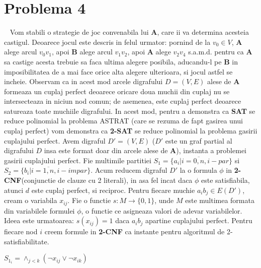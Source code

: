 \documentclass{article}
\begin{document}
\section{Problema 4}
\   
\newline
Vom stabili o strategie de joc convenabila lui \textbf{A}, care ii va determina acesteia  castigul. Deoarece jocul este descris in felul urmator: pornind de la $v_0 \in V$, \textbf{A} alege arcul $v_0v_1$, apoi \textbf{B} alege arcul $v_1v_2$, apoi \textbf{A} alege $v_2v_4$ s.a.m.d. pentru ca \textbf{A} sa castige acesta trebuie sa faca ultima alegere posibila, aducandu-l pe \textbf{B} in imposibilitatea de a mai face orice alta alegere ulterioara, si jocul astfel se incheie. 
\newline
\newline
Observam ca in acest mod arcele digrafului $D=(V,E)$ alese de \textbf{A} formeaza un cuplaj perfect deoarece oricare doua muchii din cuplaj nu se intersecteaza in niciun nod comun; de asemenea, este cuplaj perfect deoarece satureaza toate muchiile digrafului. In acest mod, pentru a demonstra ca \textbf{SAT} se reduce polinomial la problema ASTRAT (care se rezuma de fapt gasirea unui cuplaj perfect) vom demonstra ca \textbf{2-SAT} se reduce polinomial la problema gasirii cuplajului perfect.
\newline
\newline
Avem digraful $D'=(V,E)$ ($D'$ este un graf partial al digrafului $D$ insa este format doar din arcele alese de \textbf{A}), instanta a problemei gasirii cuplajului perfect. Fie multimile partitiei $S_1=\{a_i|i=\overline{0,n}, i-par\}$ si $S_2=\{b_i|i=\overline{1,n}, i-impar\}$.
\newline
\newline
Acum reducem digraful $D'$ la o formula $\phi$ in \textbf{2-CNF}(conjunctie de clauze cu 2 literali), in asa fel incat daca $\phi$ este satisfiabila, atunci $d$ este cuplaj perfect, si reciproc. 
\newline
\newline
Pentru fiecare muchie $a_ib_j \in E(D')$, cream o variabila $x_{ij}$. Fie o functie $s:M\rightarrow \{0,1\}$, unde $M$ este multimea formata din variabilele formulei $\phi$, o functie ce asigneaza valori de adevar variabilelor. Ideea este urmatoarea: $s(x_{ij})=1$ daca $a_ib_j$ apartine cuplajului perfect. Pentru fiecare nod $i$ creem formule in \textbf{2-CNF} ca instante pentru algoritmul de 2-satisfiabilitate.
\begin{center}
$S_{1_i}=\wedge_{j<k}(\lnot x_{ij}\lor \lnot x_{ik})$
\end{center}
\end{document}
